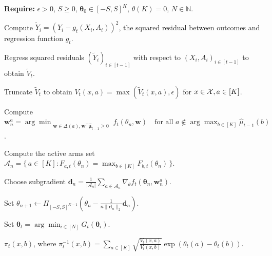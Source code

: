 \documentclass{article}
\begin{document}
\begin{algorithm}[t]
\caption{Sampling Policy via Subgradient Descent}
\label{alg:proj-subgradient}
\begin{algorithmic}[1]


\State \textbf{Require:} $\epsilon > 0$, $S\geq 0$, $\bm\theta_{0}\in [-S,S]^K$, $\theta(K) = 0$, $N\in\mathbb{N}$.


\State Compute $\tilde{Y}_i = (Y_i - g_t(X_i,A_i))^2$, the squared residual between outcomes and regression function $g_t$. 

\State Regress squared residuals $(\tilde{Y}_i)_{i \in [t-1]}$ with respect to $(X_i, A_i)_{i \in [t-1]}$ to obtain $\tilde{V}_t$. 

\State Truncate $\tilde{V}_t$ to obtain $V_t(x,a) = \max\left(\tilde{V}_t(x,a), \epsilon\right)$ for $x \in \mathcal{X}, a \in [K]$. 



    \State Compute 
    $\displaystyle 
    \bm{w}^{a}_{n} = 
    \arg\min_{\substack{\bm{w}\in\Delta(a), \bm{w}^\top \hat{\boldsymbol{\mu}}_{t-1}\ge 0}}
    f_{t}(\theta_n,\bm{w})
    \quad \text{for all } a \not\in \arg\max_{b\in[K]} \hat{\mu}_{t-1}(b)$.\label{l:compute_weights}

    \State Compute the active arms set
    $\displaystyle 
    \mathcal{A}_n = \{\, a\in [K] : F_{a,t}(\theta_n)=\max_{b\in[K]} F_{b,t}(\theta_n)\,\}$. \label{l:compute_active_set}

    \State Choose subgradient
    $\displaystyle
    \bm{d}_n = \frac{1}{|\mathcal{A}_n|}
    \sum_{a\in\mathcal{A}_n} \nabla_{\theta} f_{t}(\bm\theta_n,\bm{w}^{a}_{n})$.\label{l:compute_subgradient}

    \State Set $\displaystyle \theta_{n+1} \gets 
    \Pi_{[-S, S]^{K-1}}\!\left(\theta_n - \frac{1}{n \| \bm{d}_n \|_2} \bm{d}_n\right)$. \label{l:projection_step}

\EndFor
\State Set $\displaystyle  \bm{\theta}_t = \arg\min_{i\in[N]} G_t(\bm\theta_i)$.

\State \Return $\displaystyle \pi_t(x,b)$, where $\pi_t^{-1}(x,b) = \sum_{a \in [K]} \sqrt{\frac{V_t(x,a)}{V_t(x,b)}}\exp\left(\theta_t(a) - \theta_t(b)\right)$.

\EndProcedure
\end{algorithmic}
\end{algorithm}
\end{document}
